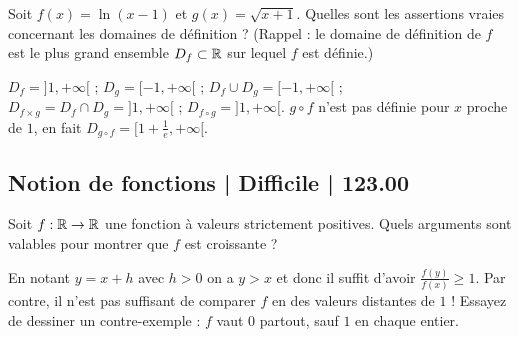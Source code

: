 \begin{question}
Soit $f(x) = \ln(x-1)$ et $g(x) = \sqrt{x+1}$. 
Quelles sont les assertions vraies concernant les domaines de définition ? (Rappel : le domaine de définition de $f$ est le plus grand ensemble $D_f \subset \mathbb{R}$ sur lequel $f$ est définie.)
\begin{answers}
    \good{$D_f \cup D_g = [-1,+\infty[$.}

    \bad{Pour la composition $f \circ g$, $D_{f\circ g} = [-1,+\infty[$.}

    \bad{Pour la composition $g \circ f$, $D_{g\circ f} = ]1,+\infty[$.}

    \good{Pour la fonction $f \times g$, $D_{f\times g} = ]1,+\infty[$.}   
\end{answers}
\begin{explanations}
$D_f = ]1,+\infty[$ ; $D_g = [-1,+\infty[$ ; 
$D_f \cup D_g = [-1,+\infty[$ ;
$D_{f \times g} = D_f \cap D_g = ]1,+\infty[$ ;
$D_{f \circ g} = ]1,+\infty[$.
$g \circ f$ n'est pas définie pour $x$ proche de $1$, en fait 
$D_{g\circ f} = [1+\frac1e,+\infty[$.
\end{explanations}
\end{question}



\subsection{Notion de fonctions | Difficile | 123.00}


\begin{question}
Soit $f : \mathbb{R} \to \mathbb{R}$ une fonction à valeurs strictement positives. Quels arguments sont valables pour montrer que $f$ est croissante ?

\begin{answers}



   
\end{answers}
\begin{explanations}
En notant $y = x+h$ avec $h>0$ on a $y > x$ et donc il suffit d'avoir $\frac{f(y)}{f(x)} \ge 1$.
Par contre, il n'est pas suffisant de comparer $f$ en des valeurs distantes de $1$ ! Essayez de dessiner un contre-exemple : $f$ vaut $0$ partout, sauf $1$ en chaque entier.

\end{explanations}
\end{question}


